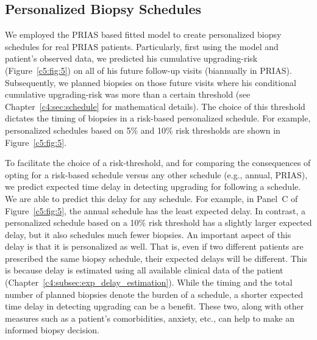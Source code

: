 \subsection{Personalized Biopsy Schedules}
We employed the PRIAS based fitted model to create personalized biopsy schedules for real PRIAS patients. Particularly, first using the model and patient's observed data, we predicted his cumulative upgrading-risk (Figure~\ref{c5:fig:5}) on all of his future follow-up visits (biannually in PRIAS). Subsequently, we planned biopsies on those future visits where his conditional cumulative upgrading-risk was more than a certain threshold (see Chapter~\ref{c4:sec:schedule} for mathematical details). The choice of this threshold dictates the timing of biopsies in a risk-based personalized schedule. For example, personalized schedules based on 5\% and 10\% risk thresholds are shown in Figure~\ref{c5:fig:5}. 

To facilitate the choice of a risk-threshold, and for comparing the consequences of opting for a risk-based schedule versus any other schedule (e.g., annual, PRIAS), we predict expected time delay in detecting upgrading for following a schedule. We are able to predict this delay for any schedule. For example, in Panel~C of Figure~\ref{c5:fig:5}, the annual schedule has the least expected delay. In contrast, a personalized schedule based on a 10\% risk threshold has a slightly larger expected delay, but it also schedules much fewer biopsies. An important aspect of this delay is that it is personalized as well. That is, even if two different patients are prescribed the same biopsy schedule, their expected delays will be different. This is because delay is estimated using all available clinical data of the patient (Chapter~\ref{c4:subsec:exp_delay_estimation}). While the timing and the total number of planned biopsies denote the burden of a schedule, a shorter expected time delay in detecting upgrading can be a benefit. These two, along with other measures such as a patient's comorbidities, anxiety, etc., can help to make an informed biopsy decision.

